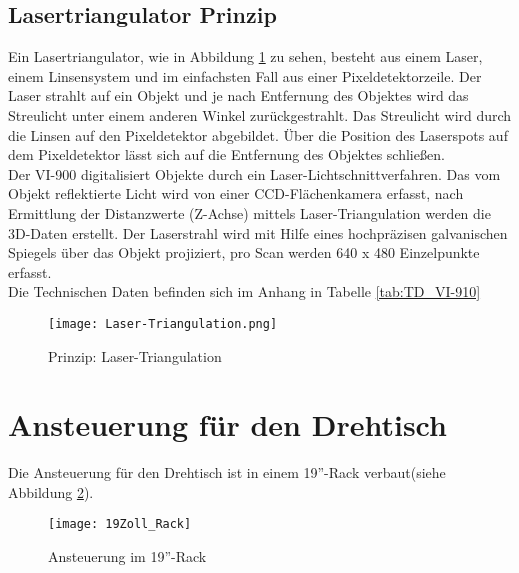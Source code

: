 \subsection{Lasertriangulator Prinzip}
\label{sec:LaserTri}
Ein Lasertriangulator, wie in Abbildung \ref{fig:LaserTriangulator} zu sehen, besteht aus einem Laser, einem Linsensystem und im einfachsten Fall aus einer Pixeldetektorzeile. Der Laser strahlt auf ein Objekt und je nach Entfernung des Objektes wird das Streulicht unter einem anderen Winkel zurückgestrahlt. Das Streulicht wird durch die Linsen auf den Pixeldetektor abgebildet. Über die Position des Laserspots auf dem Pixeldetektor lässt sich auf die Entfernung des Objektes schließen.\\
Der VI-900 digitalisiert Objekte durch ein Laser-Lichtschnittverfahren. Das vom Objekt reflektierte Licht wird von einer CCD-Flächenkamera erfasst, nach Ermittlung der Distanzwerte (Z-Achse) mittels Laser-Triangulation werden die 3D-Daten erstellt. Der Laserstrahl wird mit Hilfe eines hochpräzisen galvanischen Spiegels über das Objekt projiziert, pro Scan werden 640 x 480 Einzelpunkte erfasst.\cite{Minolta:Einleitung}\\
Die Technischen Daten befinden sich im Anhang in Tabelle \ref{tab:TD_VI-910}
\begin{figure}[htb]
\centering
\texttt{[image: Laser-Triangulation.png]}
\caption{Prinzip: Laser-Triangulation}
\label{fig:LaserTriangulator}
\end{figure}

\section{Ansteuerung für den Drehtisch}
\label{sec:AnsteuerungDrehtisch}
Die Ansteuerung für den Drehtisch ist in einem 19''-Rack verbaut(siehe Abbildung \ref{fig:19Zoll_Rack}).
\begin{figure}[htb]
\centering
\texttt{[image: 19Zoll\_Rack]}
\caption{Ansteuerung im 19''-Rack}
\label{fig:19Zoll_Rack}
\end{figure}

